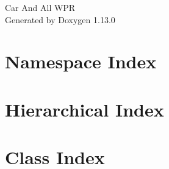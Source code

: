 \documentclass[twoside]{book}
\newcommand{\+}{\discretionary{\mbox{\scriptsize$\hookleftarrow$}}{}{}}
\newcommand{\clearemptydoublepage}{%
    \newpage{\pagestyle{empty}\cleardoublepage}%
  }
\begin{document}
  \raggedbottom
    \hypersetup{pageanchor=false,
                bookmarksnumbered=true,
                pdfencoding=unicode
               }
  \begin{titlepage}
  \vspace*{7cm}
  \begin{center}%
  {\Large Car And All WPR}\\
  \vspace*{1cm}
  {\large Generated by Doxygen 1.13.0}\\
  \end{center}
  \end{titlepage}
  \clearemptydoublepage
  \tableofcontents
  \clearemptydoublepage
  \hypersetup{pageanchor=true}
\chapter{Namespace Index}

\chapter{Hierarchical Index}

\chapter{Class Index}

\end{document}
